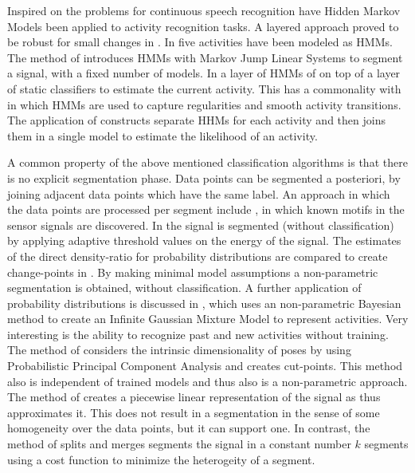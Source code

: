 Inspired on the problems for continuous speech recognition have Hidden Markov Models been applied to activity recognition tasks.
A layered approach proved to be robust for small changes in \cite{perdikis2008recognition}.
In \cite{shi2009towards} five activities have been modeled as HMMs.
The method of \cite{fox2010bayesian} introduces HMMs with Markov Jump Linear Systems to segment a signal, with a fixed number of models.
In \cite{lester2006practical} a layer of HMMs of on top of a layer of static classifiers to estimate the current activity.
This has a commonality with \cite{lester2005hybrid} in which HMMs are used to capture regularities and smooth activity transitions.
The application of \cite{guenterberg2009distributed} constructs separate HHMs for each activity and then joins them in a single model to estimate the likelihood of an activity.

A common property of the above mentioned classification algorithms is that there is no explicit segmentation phase.
Data points can be segmented a posteriori, by joining adjacent data points which have the same label.
An approach in which the data points are processed per segment include \cite{minnen2006discovering}, in which known motifs in the sensor signals are discovered.
In \cite{guenterberg2009automatic} the signal is segmented (without classification) by applying adaptive threshold values on the energy of the signal.
The estimates of the direct density-ratio for probability distributions are compared to create change-points in \cite{kawahara2009change}.
By making minimal model assumptions a non-parametric segmentation is obtained, without classification.
A further application of probability distributions is discussed in \cite{ahmed2012non}, which uses an non-parametric Bayesian method to create an Infinite Gaussian Mixture Model to represent activities.
Very interesting is the ability to recognize past and new activities without training.
The method of \cite{barbivc2004segmenting} considers the intrinsic dimensionality of poses by using Probabilistic Principal Component Analysis and creates cut-points.
This method also is independent of trained models and thus also is a non-parametric approach.
The method of \cite{keogh2001online} creates a piecewise linear representation of the signal as thus approximates it.
This does not result in a segmentation in the sense of some homogeneity over the data points, but it can support one.
In contrast, the method of \cite{himberg2001time} splits and merges segments the signal in a constant number $k$ segments using a cost function to minimize the heterogeity of a segment.

